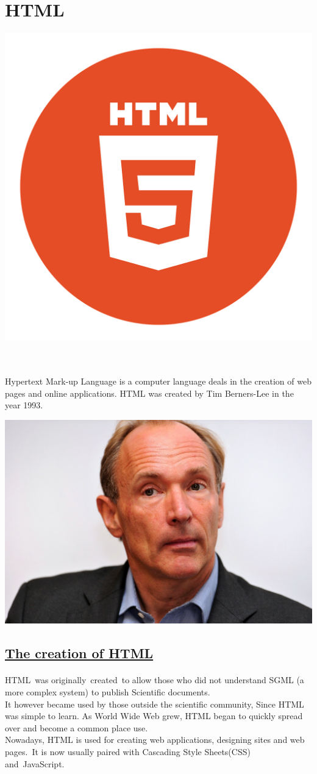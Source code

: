\documentclass[[12pt]{article}
\begin{document}
	\newpage
	
	\section* {\Huge{HTML}}	
	\includegraphics[width= 0.1\linewidth]{pics/html5_logo.png} \raggedright\\
	\begin{minipage}{0.59\linewidth}		
		\paragraph{}
		\large Hypertext Mark-up Language is a computer language deals in the creation of web pages and online applications. HTML was created by Tim Berners-Lee in the year 1993.		
	\end{minipage}
	\begin{minipage}{0.39\linewidth}
		\includegraphics[width= \linewidth]{pics/tbl.jpeg}
	\end{minipage}
	\subsection*{\Large \underline{The creation of HTML}}
	\paragraph{}
	HTML was originally created to allow those who did not understand SGML (a more complex system) to publish
	Scientific documents.\\
	It however became used by those outside the scientific community, Since HTML was simple to learn. As World Wide Web grew, HTML began to quickly spread over and become a common place use.\\
	Nowadays, HTML is used for creating web applications, designing sites and web pages. It is now usually paired with Cascading Style Sheets(CSS) and JavaScript.\\
\end{document}
